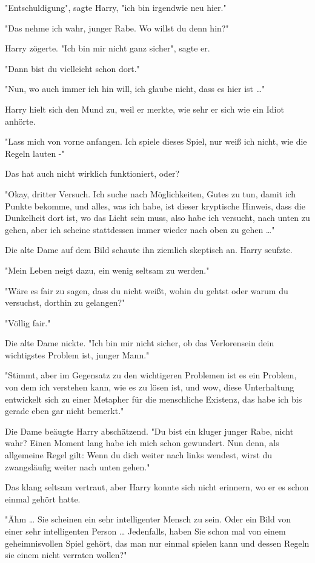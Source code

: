 {"Entschuldigung", sagte Harry, "ich bin irgendwie neu hier."

"Das nehme ich wahr, junger Rabe. Wo willst du denn hin?"

Harry zögerte. "Ich bin mir nicht ganz sicher", sagte er.

"Dann bist du vielleicht schon dort."

"Nun, wo auch immer ich hin will, ich glaube nicht, dass es hier ist …"

Harry hielt sich den Mund zu, weil er merkte, wie sehr er sich wie ein Idiot anhörte.

"Lass mich von vorne anfangen. Ich spiele dieses Spiel, nur weiß ich nicht, wie die Regeln lauten -"

Das hat auch nicht wirklich funktioniert, oder?

"Okay, dritter Versuch. Ich suche nach Möglichkeiten, Gutes zu tun, damit ich Punkte bekomme, und alles, was ich habe, ist dieser kryptische Hinweis, dass die Dunkelheit dort ist, wo das Licht sein muss, also habe ich versucht, nach unten zu gehen, aber ich scheine stattdessen immer wieder nach oben zu gehen …"

Die alte Dame auf dem Bild schaute ihn ziemlich skeptisch an. Harry seufzte.

"Mein Leben neigt dazu, ein wenig seltsam zu werden."

"Wäre es fair zu sagen, dass du nicht weißt, wohin du gehtst oder warum du versuchst, dorthin zu gelangen?"

"Völlig fair."

Die alte Dame nickte. "Ich bin mir nicht sicher, ob das Verlorensein dein wichtigstes Problem ist, junger Mann."

"Stimmt, aber im Gegensatz zu den wichtigeren Problemen ist es ein Problem, von dem ich verstehen kann, wie es zu lösen ist, und wow, diese Unterhaltung entwickelt sich zu einer Metapher für die menschliche Existenz, das habe ich bis gerade eben gar nicht bemerkt."

Die Dame beäugte Harry abschätzend. "Du bist ein kluger junger Rabe, nicht wahr? Einen Moment lang habe ich mich schon gewundert. Nun denn, als allgemeine Regel gilt: Wenn du dich weiter nach links wendest, wirst du zwangsläufig weiter nach unten gehen."

Das klang seltsam vertraut, aber Harry konnte sich nicht erinnern, wo er es schon einmal gehört hatte.

"Ähm … Sie scheinen ein sehr intelligenter Mensch zu sein. Oder ein Bild von einer sehr intelligenten Person … Jedenfalls, haben Sie schon mal von einem geheimnisvollen Spiel gehört, das man nur einmal spielen kann und dessen Regeln sie einem nicht verraten wollen?"

}
